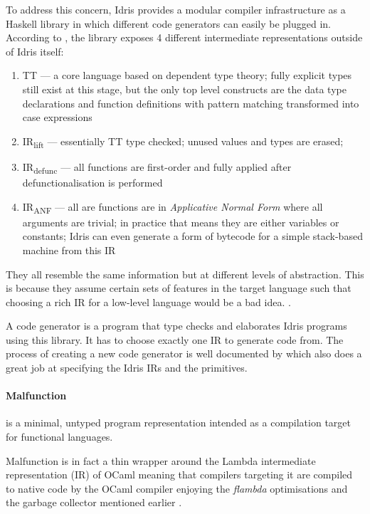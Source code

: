 \documentclass[a4paper,twocolumn]{article}
\begin{document}
To address this concern, Idris provides a modular compiler
infrastructure as a Haskell library in which different code
generators can easily be plugged in.
According to \cite{crosscompilers},
the library exposes 4 different intermediate representations outside
of Idris itself:
\begin{enumerate}
    \item TT --- a core language based on dependent type theory; fully
          explicit types still exist at this stage, but the only top level
          constructs are the data type declarations and function definitions
          with pattern matching transformed into case expressions
    \item IR\textsubscript{lift} --- essentially TT type checked; unused values
          and types are erased;
    \item IR\textsubscript{defunc} --- all functions are first-order
          and fully applied after defunctionalisation is performed
    \item IR\textsubscript{ANF} --- all are functions are in
          \emph{Applicative Normal Form} where all arguments are trivial;
          in practice that means they are either variables or constants;
          Idris can even generate a form of bytecode for a simple
          stack-based machine from this IR
\end{enumerate}
They all resemble the same information but at different levels
of abstraction. This is because they assume certain sets of features
in the target language such that choosing a rich IR
for a low-level language would be a bad idea.
\cite{ElliottIdrisErlang}.


A code generator is a program that type checks and elaborates
Idris programs using this library.
It has to choose exactly one
IR to generate code from.
The process of creating a new code generator is well
documented by \cite{ElliottIdrisErlang} which also does a great job
at specifying the Idris IRs and the primitives.


\paragraph{Malfunction}
is a minimal, untyped program representation intended as a
compilation target for functional languages.

Malfunction is in fact a thin wrapper around the Lambda intermediate
representation (IR) of OCaml meaning that compilers targeting it
are compiled to native code by the OCaml compiler enjoying the
\emph{flambda} optimisations and the garbage collector mentioned
earlier \cite{dolan2016malfunctional}.
\end{document}
